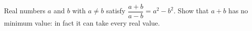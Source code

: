 Real numbers $a$ and $b$ with $a\ne b$ satisfy $\dfrac{a+b}{a-b}=a^2-b^2$. Show that $a+b$ has no minimum value: in fact it can take every real value.
